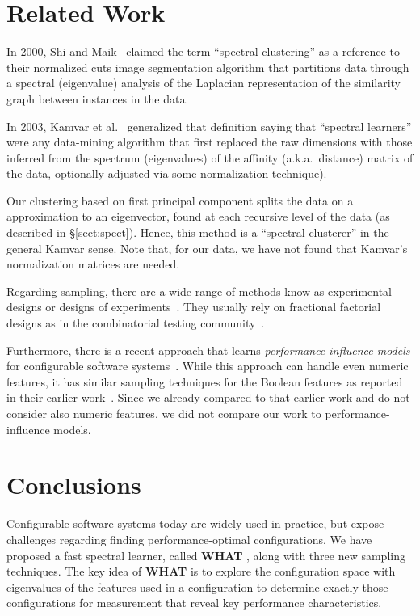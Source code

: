 \documentclass{newsig}
\newcommand{\tion}[1]{\S\ref{sect:#1}}
\newcommand{\what}{{\bf WHAT }}
\begin{document}
\section{Related Work}
\label{sect:related}
 
In 2000, Shi and Maik~\cite{shi00} claimed the term ``spectral clustering'' as a reference to their normalized cuts
image
segmentation algorithm that  partitions data through a spectral (eigenvalue) analysis of the  
Laplacian representation of the similarity graph between instances in the data.

In 2003, Kamvar et al.~\cite{kamvar2003spectral}  generalized that definition saying that ``spectral learners''
were any data-mining algorithm that first replaced the raw
dimensions with those inferred from the spectrum (eigenvalues) of the affinity (a.k.a.\ distance)
matrix of the data, optionally adjusted via some normalization technique).

Our clustering based on first principal component splits the data on a   approximation to an eigenvector, found at each recursive level
of the data (as described in \tion{spect}). 
Hence, this  method is a ``spectral clusterer'' in the general Kamvar sense. 
Note that,
for our data, we have
not found that Kamvar's normalization matrices are needed.

Regarding sampling, there are a wide range of methods know as experimental designs or designs of experiments~\cite{pukelsheim2006optimal}. They usually rely on fractional factorial designs as in the combinatorial testing community~\cite{Kuhn:2013}. 

Furthermore, there is a recent approach that learns {\em per\-for\-mance-influence models} for configurable software systems~\cite{SGA+15}. While this approach can handle even numeric features, it has similar sampling techniques for the Boolean features as reported in their earlier work~\cite{siegmund2012predicting}. Since we already compared to that earlier work and do not consider also numeric features, we did not compare our work to performance-influence models.
 



\section{Conclusions}

Configurable software systems today are widely used in practice, but expose challenges regarding finding performance-optimal configurations. We have proposed a fast spectral learner, called \what,  along with three new sampling techniques. The key idea of \what is to explore the configuration space with eigenvalues of the features used in a configuration to determine exactly those configurations for measurement that reveal key performance characteristics. 
\end{document}
